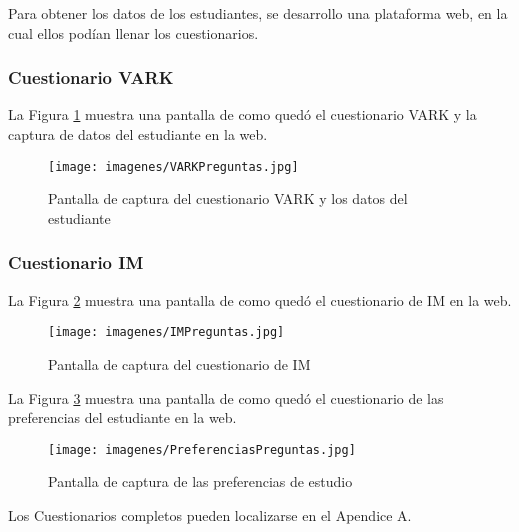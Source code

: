 Para obtener los datos de los estudiantes, se desarrollo una plataforma web, en la cual ellos pod\'ian llenar los cuestionarios.
   
\subsubsection{Cuestionario VARK}    

La Figura \ref{figure:VARKPreguntas} muestra una pantalla de como qued\'o el cuestionario VARK y la captura de datos del estudiante en la web.

\begin{figure}[!h]
\begin{center}
\texttt{[image: imagenes/VARKPreguntas.jpg]}
\caption{Pantalla de captura del cuestionario VARK y los datos del estudiante}
\label{figure:VARKPreguntas}
\end{center}
\end{figure}

\newpage
\subsubsection{Cuestionario IM} 

La Figura \ref{figure:IMPreguntas} muestra una pantalla de como qued\'o el cuestionario de IM en la web.

\begin{figure}[!h]
\begin{center}
\texttt{[image: imagenes/IMPreguntas.jpg]}
\caption{Pantalla de captura del cuestionario de IM}
\label{figure:IMPreguntas}
\end{center}
\end{figure}

La Figura \ref{figure:PreferenciasPreguntas} muestra una pantalla de como qued\'o el cuestionario de las preferencias del estudiante en la web.

\begin{figure}[!h]
\begin{center}
\texttt{[image: imagenes/PreferenciasPreguntas.jpg]}
\caption{Pantalla de captura de las preferencias de estudio}
\label{figure:PreferenciasPreguntas}
\end{center}
\end{figure}

\newpage
Los Cuestionarios completos pueden localizarse en el Apendice A.    


